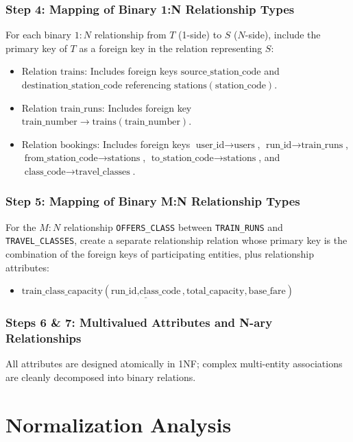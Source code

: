 \documentclass[12pt,a4paper]{report}
\begin{document}
\subsection*{Step 4: Mapping of Binary 1:N Relationship Types}
For each binary $1:N$ relationship from $T$ (1-side) to $S$ ($N$-side), include the primary key of $T$ as a foreign key in the relation representing $S$:
\begin{itemize}
    \item Relation $\text{trains}$: Includes foreign keys $\text{source\_station\_code}$ and $\text{destination\_station\_code}$ referencing $\text{stations}(\text{station\_code})$.
    \item Relation $\text{train\_runs}$: Includes foreign key $\text{train\_number} \to \text{trains}(\text{train\_number})$.
    \item Relation $\text{bookings}$: Includes foreign keys $\text{user\_id} \to \text{users}$, $\text{run\_id} \to \text{train\_runs}$, $\text{from\_station\_code} \to \text{stations}$, $\text{to\_station\_code} \to \text{stations}$, and $\text{class\_code} \to \text{travel\_classes}$.
\end{itemize}

\subsection*{Step 5: Mapping of Binary M:N Relationship Types}
For the $M:N$ relationship \texttt{OFFERS\_CLASS} between \texttt{TRAIN\_RUNS} and \texttt{TRAVEL\_CLASSES}, create a separate relationship relation whose primary key is the combination of the foreign keys of participating entities, plus relationship attributes:
\begin{itemize}
    \item $\text{train\_class\_capacity}(\underline{\text{run\_id}, \text{class\_code}}, \text{total\_capacity}, \text{base\_fare})$
\end{itemize}

\subsection*{Steps 6 \& 7: Multivalued Attributes and N-ary Relationships}
All attributes are designed atomically in 1NF; complex multi-entity associations are cleanly decomposed into binary relations.

\chapter{Normalization Analysis}
\end{document}
